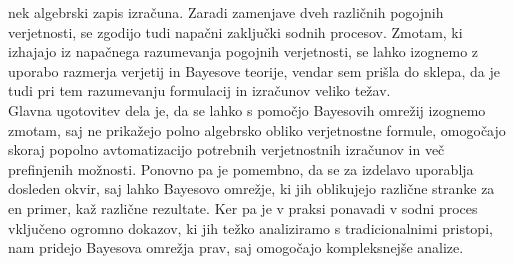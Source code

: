\documentclass[fin1, tisk]{fmfdelo}
\theoremstyle{definition}
\theoremstyle{trditev}
\theoremstyle{izrek}
\begin{document}
nek algebrski zapis izračuna. Zaradi zamenjave dveh različnih pogojnih verjetnosti, se zgodijo tudi napačni zaključki sodnih procesov. Zmotam, ki izhajajo iz napačnega
razumevanja pogojnih verjetnosti, se lahko izognemo z uporabo razmerja verjetij in Bayesove teorije, vendar sem prišla do sklepa, da je tudi pri tem razumevanju
formulacij in izračunov veliko težav. \\
Glavna ugotovitev dela je, da se lahko s pomočjo Bayesovih omrežij izognemo zmotam, saj ne prikažejo polno algebrsko obliko verjetnostne formule, omogočajo skoraj popolno
avtomatizacijo potrebnih verjetnostnih izračunov in več prefinjenih možnosti. Ponovno pa je pomembno, da se za izdelavo uporablja dosleden okvir, saj lahko Bayesovo omrežje,
ki jih oblikujejo različne stranke za en primer, kaž različne rezultate. Ker pa je v praksi ponavadi v sodni proces vključeno ogromno dokazov, ki jih težko analiziramo s
tradicionalnimi pristopi, nam pridejo Bayesova omrežja prav, saj omogočajo kompleksnejše analize.

\end{document}
